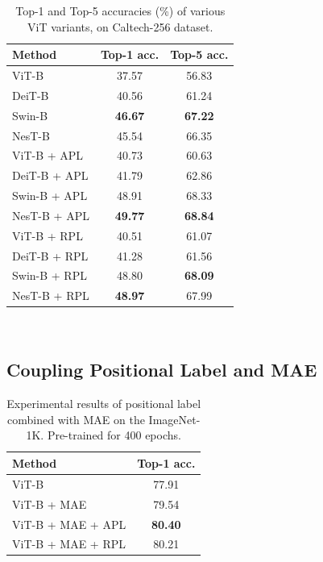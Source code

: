 \documentclass{article}
\begin{document}
\begin{table}[h]
   \centering
   \caption{Top-1 and Top-5 accuracies (\%) of various ViT variants, on Caltech-256 dataset.}
   \begin{tabular}{l|c|c}
      \hline %
      Method                   & Top-1 acc.      & Top-5 acc.      \\
      \hline %
      ViT-B \cite{DBLP:journals/corr/abs-2010-11929}      & 37.57     &56.83     \\
      DeiT-B \cite{pmlr-v139-touvron21a}    & 40.56     &61.24     \\
      Swin-B \cite{Liu_2021_ICCV}    & \textbf{46.67}     &\textbf{67.22}     \\
      NesT-B \cite{zhang2022nested}   & 45.54     &66.35     \\
      \hline %
      ViT-B + APL      & 40.73     &60.63     \\
      DeiT-B + APL    & 41.79     &62.86     \\
      Swin-B + APL    & 48.91     &68.33     \\
      NesT-B + APL    & \textbf{49.77}     &\textbf{68.84}     \\
      \hline %
      ViT-B + RPL      & 40.51     &61.07     \\
      DeiT-B + RPL    & 41.28     &61.56     \\
      Swin-B + RPL    & 48.80     & \textbf{68.09}     \\
      NesT-B + RPL    & \textbf{48.97}     &67.99     \\
      \hline %
   \end{tabular} \\
   \label{Caltech-256-Top1AndTop5}
\end{table}

\subsection{Coupling Positional Label and MAE}

\begin{table}[h]
   \centering
   \caption{Experimental results of positional label combined with MAE on the ImageNet-1K. Pre-trained for 400 epochs.}
   \begin{tabular}{l|c}
      \hline %
      Method                   & Top-1 acc.           \\
      \hline %
      ViT-B \cite{DBLP:journals/corr/abs-2010-11929}      & 77.91         \\
      ViT-B + MAE \cite{DBLP:journals/corr/abs-2111-06377}      & 79.54        \\
      ViT-B + MAE + APL   &   \textbf{80.40}   \\
      ViT-B + MAE + RPL   &   80.21   \\
      \hline %
   \end{tabular} \\
   \label{MAE-accuracy}
\end{table}
\end{document}
